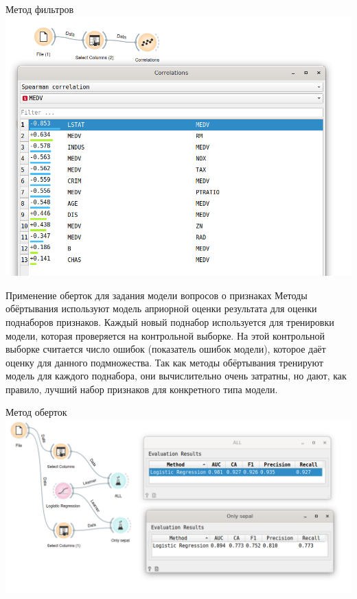 \documentclass{beamer}
\begin{document}
 
 \begin{frame}{Метод фильтров}
  \includegraphics[scale=0.4]{task07_01.png}
 \end{frame} 
 
\begin{frame}{Применение оберток для задания модели вопросов о признаках}
  Методы обёртывания используют модель априорной оценки результата для оценки поднаборов признаков. Каждый новый поднабор используется для тренировки модели,
   которая проверяется на контрольной выборке. 
   На этой контрольной выборке считается число ошибок (показатель ошибок модели), которое даёт оценку для данного подмножества. Так 
   как методы обёртывания тренируют модель для каждого поднабора, они вычислительно очень затратны, но дают, как правило, лучший набор признаков для конкретного типа модели.
\end{frame}
 
  \begin{frame}{Метод оберток}
  \includegraphics[scale=0.4]{task07_02.png}
 \end{frame} 
 
\end{document}

